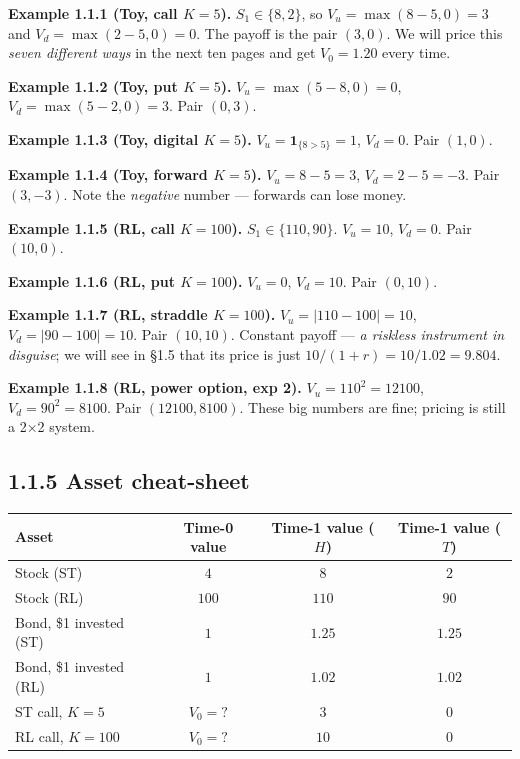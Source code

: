 \documentclass[
  10pt,
  twoside]{book}
\newcounter{none} %
\begin{document}
\textbf{Example 1.1.1 (Toy, call \(K=5\)).} \(S_1\in\{8,2\}\), so
\(V_u=\max(8-5,0)=3\) and \(V_d=\max(2-5,0)=0\). The payoff is the pair
\((3,0)\). We will price this \emph{seven different ways} in the next
ten pages and get \(V_0=1.20\) every time.

\textbf{Example 1.1.2 (Toy, put \(K=5\)).} \(V_u=\max(5-8,0)=0\),
\(V_d=\max(5-2,0)=3\). Pair \((0,3)\).

\textbf{Example 1.1.3 (Toy, digital \(K=5\)).}
\(V_u=\mathbf{1}_{\{8>5\}}=1\), \(V_d=0\). Pair \((1,0)\).

\textbf{Example 1.1.4 (Toy, forward \(K=5\)).} \(V_u=8-5=3\),
\(V_d=2-5=-3\). Pair \((3,-3)\). Note the \emph{negative} number ---
forwards can lose money.

\textbf{Example 1.1.5 (RL, call \(K=100\)).} \(S_1\in\{110,90\}\).
\(V_u=10\), \(V_d=0\). Pair \((10,0)\).

\textbf{Example 1.1.6 (RL, put \(K=100\)).} \(V_u=0\), \(V_d=10\). Pair
\((0,10)\).

\textbf{Example 1.1.7 (RL, straddle \(K=100\)).} \(V_u=|110-100|=10\),
\(V_d=|90-100|=10\). Pair \((10,10)\). Constant payoff --- \emph{a
riskless instrument in disguise}; we will see in §1.5 that its price is
just \(10/(1+r)=10/1.02=9.804\).

\textbf{Example 1.1.8 (RL, power option, exp 2).} \(V_u=110^2=12100\),
\(V_d=90^2=8100\). Pair \((12100,8100)\). These big numbers are fine;
pricing is still a 2×2 system.

\subsection{1.1.5 Asset cheat-sheet}\label{asset-cheat-sheet}

{\def\LTcaptype{none} %
\begin{table}[H]
\centering
\begin{tabular}{|l|c|c|c|}
\toprule
Asset & Time-0 value & Time-1 value (\(H\)) & Time-1 value (\(T\)) \\
\midrule



Stock (ST) & \(4\) & \(8\) & \(2\) \\
Stock (RL) & \(100\) & \(110\) & \(90\) \\
Bond, \$1 invested (ST) & \(1\) & \(1.25\) & \(1.25\) \\
Bond, \$1 invested (RL) & \(1\) & \(1.02\) & \(1.02\) \\
ST call, \(K=5\) & \(V_0=?\) & \(3\) & \(0\) \\
RL call, \(K=100\) & \(V_0=?\) & \(10\) & \(0\) \\
\bottomrule
\end{tabular}
\end{table}
}
\end{document}
